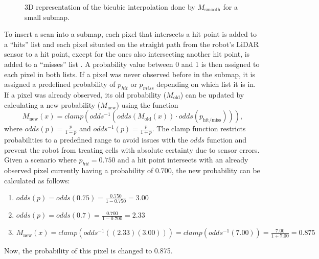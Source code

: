 \begin{figure}[htb]
    \centering
    \qquad
    \caption{3D representation of the bicubic interpolation done by $M_\text{smooth}$ for a small submap.}
    \label{fig:bicubic}
\end{figure}

To insert a scan into a submap, each pixel that intersects a hit point is added to a ``hits'' list and each pixel situated on the straight path from the robot's LiDAR sensor to a hit point, except for the ones also intersecting another hit point, is added to a ``misses'' list \parencite{hessRealtimeLoopClosure2016}. A probability value between 0 and 1 is then assigned to each pixel in both lists. If a pixel was never observed before in the submap, it is assigned a predefined probability of $p_{hit}$ or $p_{miss}$ depending on which list it is in. If a pixel was already observed, its old probability ($M_\text{old}$) can be updated by calculating a new probability ($M_\text{new}$) using the function
\[
    M_\text{new}(x)=clamp(odds^{-1}(odds(M_\text{old}(x))\cdot odds(p_\text{hit/miss}))),
\]
where $odds(p)=\frac{p}{1-p}$ and $odds^{-1}(p)=\frac{p}{1+p}$. The clamp function restricts probabilities to a predefined range to avoid issues with the $odds$ function and prevent the robot from treating cells with absolute certainty due to sensor errors. Given a scenario where $p_{hit}=0.750$ and a hit point intersects with an already observed pixel currently having a probability of 0.700, the new probability can be calculated as follows:
\begin{enumerate}
    \item $odds(p)=odds(0.75)=\frac{0.750}{1-0.750}=3.00$
    \item $odds(p)=odds(0.7)=\frac{0.700}{1-0.700}=2.33$
    \item $M_\text{new}(x)=clamp(odds^{-1}((2.33)(3.00)))=clamp(odds^{-1}(7.00))=\frac{7.00}{1+7.00}=0.875$
\end{enumerate}
Now, the probability of this pixel is changed to 0.875.

